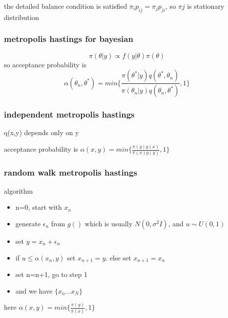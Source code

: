 \documentclass[10pt]{article}
\theoremstyle{break}
\begin{document}
    the detailed balance condition is satisfied 
    $\pi_ip_{ij}=\pi_jp_{ji}$, so $\pi j$ is stationary distribution

    \subsubsection{metropolis hastings for bayesian}
        $$\pi(\theta|y)\propto f(y|\theta)\pi(\theta)$$
        so acceptance probability is 
        $$\alpha(\theta_n, \theta^*)=min\{\frac{\pi(\theta^*|y)q(\theta^*, \theta_n)}
        {\pi(\theta_n|y)q(\theta_n,\theta^*)},1\}$$
    \subsubsection{independent metropolis hastings}
        q(x,y) depends only on y

        acceptance probability is $\alpha(x,y)=min\{\frac{\pi(y)g(x)}{\pi(x)g(y)},1\}$
    
    \subsubsection{random walk metropolis hastings}
        algorithm
        \begin{itemize}
            \item n=0, start with $x_n$
            \item generate $\epsilon_n$ from $g()$ which is usually $N(0,\sigma^2 I)$, and $u\sim U(0,1)$
            \item set $y=x_n+\epsilon_n$
            \item if $u\leq \alpha(x_n,y)$ set $x_{n+1}=y$. else set $x_{n+1}=x_n$
            \item set n=n+1, go to step 1
            \item and we have $\{x_n ... x_N\}$
        \end{itemize}

        here $\alpha(x,y)=min\{\frac{\pi(y)}{\pi(x)},1\}$
\end{document}
